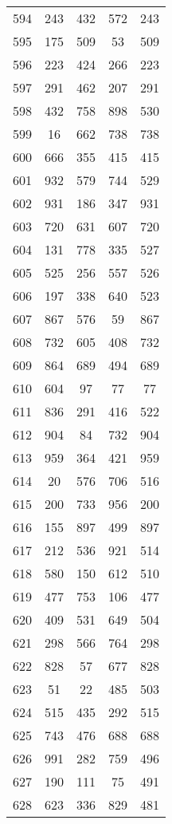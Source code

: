 \documentclass[a4paper,10pt,ngerman]{scrartcl}
\begin{document}
\begin{longtable}[c]{c|c|c|c|c}
    594 & 243 & 432 & 572 & 243 \\
    595 & 175 & 509 & 53 & 509 \\
    596 & 223 & 424 & 266 & 223 \\
    597 & 291 & 462 & 207 & 291 \\
    598 & 432 & 758 & 898 & 530 \\
    599 & 16 & 662 & 738 & 738 \\
    600 & 666 & 355 & 415 & 415 \\
    601 & 932 & 579 & 744 & 529 \\
    602 & 931 & 186 & 347 & 931 \\
    603 & 720 & 631 & 607 & 720 \\
    604 & 131 & 778 & 335 & 527 \\
    605 & 525 & 256 & 557 & 526 \\
    606 & 197 & 338 & 640 & 523 \\
    607 & 867 & 576 & 59 & 867 \\
    608 & 732 & 605 & 408 & 732 \\
    609 & 864 & 689 & 494 & 689 \\
    610 & 604 & 97 & 77 & 77 \\
    611 & 836 & 291 & 416 & 522 \\
    612 & 904 & 84 & 732 & 904 \\
    613 & 959 & 364 & 421 & 959 \\
    614 & 20 & 576 & 706 & 516 \\
    615 & 200 & 733 & 956 & 200 \\
    616 & 155 & 897 & 499 & 897 \\
    617 & 212 & 536 & 921 & 514 \\
    618 & 580 & 150 & 612 & 510 \\
    619 & 477 & 753 & 106 & 477 \\
    620 & 409 & 531 & 649 & 504 \\
    621 & 298 & 566 & 764 & 298 \\
    622 & 828 & 57 & 677 & 828 \\
    623 & 51 & 22 & 485 & 503 \\
    624 & 515 & 435 & 292 & 515 \\
    625 & 743 & 476 & 688 & 688 \\
    626 & 991 & 282 & 759 & 496 \\
    627 & 190 & 111 & 75 & 491 \\
    628 & 623 & 336 & 829 & 481 \\

\end{longtable}
\end{document}
